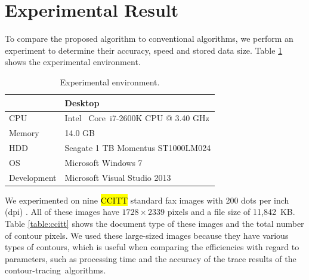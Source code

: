 \documentclass[sensors,article,accept,moreauthors,pdftex,10pt,a4paper]{mdpi}
\begin{document}
\section{Experimental Result}


To compare the proposed algorithm to conventional algorithms, we perform an experiment to determine their accuracy, speed and stored data size. Table \ref{table:exp_environment} shows the experimental environment.

\begin{table}[H]
	\centering
	\begin{tabular}{ll}
		\toprule
		 & \textbf{Desktop} \\ 
		\midrule
		CPU & Intel\textregistered~ Core\texttrademark~i7-2600K CPU @%
		3.40 GHz \\
		Memory & 14.0 GB \\ 
		HDD%
		& Seagate 1 TB Momentus ST1000LM024 \\
		OS & Microsoft Windows 7 \\
		Development & Microsoft Visual Studio 2013 \\ 
		\bottomrule
	\end{tabular}
	\caption{Experimental environment.}
	\label{table:exp_environment}
\end{table}	


We experimented on nine \hl{CCITT}
 standard fax images with 200 dots per inch (dpi) \cite{Miyatake1997Contour}. All of these images have $1728 \times 2339$ pixels and a file size of 11,842~KB. Table \ref{table:ccitt} shows the document type of these images and the total number of contour pixels. We used these large-sized images because they have various types of contours, which is useful when comparing the efficiencies with regard to parameters, such as processing time and the accuracy of the trace results of the contour-tracing~algorithms.
\end{document}
